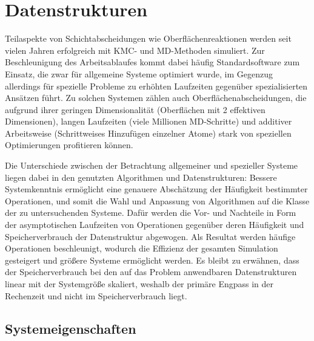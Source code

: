 \section{Datenstrukturen}
\label{sec:datastructures}


Teilaspekte von Schichtabscheidungen wie Oberflächenreaktionen werden seit vielen Jahren erfolgreich mit KMC- und MD-Methoden simuliert.
Zur Beschleunigung des Arbeitsablaufes kommt dabei häufig Standardsoftware zum Einsatz, die zwar für allgemeine Systeme optimiert wurde,
im Gegenzug allerdings für spezielle Probleme zu erhöhten Laufzeiten gegenüber spezialisierten Ansätzen führt.
Zu solchen Systemen zählen auch Oberflächenabscheidungen, die aufgrund ihrer geringen Dimensionalität (Oberflächen mit 2 effektiven Dimensionen), langen Laufzeiten (viele Millionen MD-Schritte) und additiver Arbeitsweise (Schrittweises Hinzufügen einzelner Atome) stark von speziellen Optimierungen profitieren können.


Die Unterschiede zwischen der Betrachtung allgemeiner und spezieller Systeme liegen dabei in den genutzten Algorithmen und Datenstrukturen:
Bessere Systemkenntnis ermöglicht eine genauere Abschätzung der Häufigkeit bestimmter Operationen, und somit die Wahl und Anpassung von Algorithmen auf die Klasse der zu untersuchenden Systeme.
Dafür werden die Vor- und Nachteile in Form der asymptotischen Laufzeiten von Operationen gegenüber deren Häufigkeit und Speicherverbrauch der Datenstruktur abgewogen.
Als Resultat werden häufige Operationen beschleunigt, wodurch die Effizienz der gesamten Simulation gesteigert und größere Systeme ermöglicht werden.
Es bleibt zu erwähnen, dass der Speicherverbrauch bei den auf das Problem anwendbaren Datenstrukturen linear mit der Systemgröße skaliert, weshalb der primäre Engpass in der Rechenzeit und nicht im Speicherverbrauch liegt.

\subsection{Systemeigenschaften}

